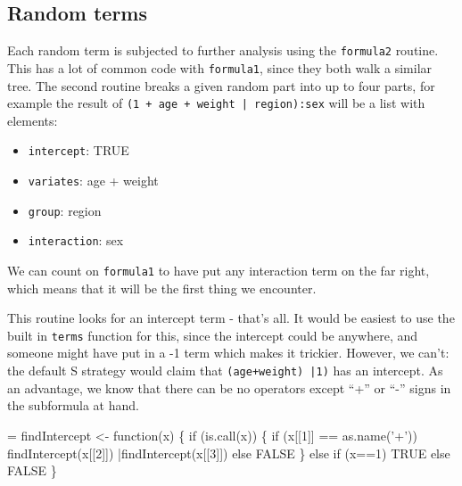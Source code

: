 \documentclass{article}
\begin{document}
\subsection{Random terms}
Each random term is subjected to further analysis using the
\Verb!formula2! routine.  
This has a lot of common code with \Verb!formula1!, since they both
walk a similar tree.  
The second routine breaks a given random part into up to four parts,
for example the result of \Verb!(1 + age + weight | region):sex!
will be a list with elements:
\begin{itemize}
  \item \Verb!intercept!:  TRUE
  \item \Verb!variates!: age + weight
  \item \Verb!group!: region
  \item \Verb!interaction!: sex
\end{itemize}

We can count on \Verb!formula1! to have put any interaction term on the
far right, which means that it will be the first thing we encounter.

This routine looks for an intercept term - that's all.
It would be easiest to use the built in \Verb!terms! function for this,
since the intercept could be anywhere, and someone might have put
in a -1 term which makes it trickier.   However, we can't: the   %
default S strategy would claim that \Verb!(age+weight) |1)! has an intercept.
As an advantage, we know that there can be no operators except ``+'' or ``-''
signs in the subformula at hand.  
\begin{nwchunk}
=
 findIntercept <- function(x) \{
    if (is.call(x)) \{
        if (x[[1]] == as.name('+')) findIntercept(x[[2]]) |findIntercept(x[[3]])
        else FALSE
        \}
    else if (x==1) TRUE
         else FALSE
 \}
\end{nwchunk}
\end{document}
